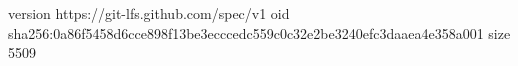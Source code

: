 version https://git-lfs.github.com/spec/v1
oid sha256:0a86f5458d6cce898f13be3ecccedc559c0c32e2be3240efc3daaea4e358a001
size 5509
